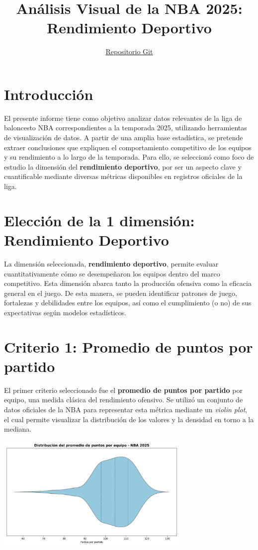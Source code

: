 \documentclass[12pt]{article}
\title{An\'alisis Visual de la NBA 2025: Rendimiento Deportivo}
\author{\href{https://github.com/betonate/VDD/blob/main/README.md}{Repositorio Git}}
\date{}
\begin{document}
\maketitle

\section*{Introducci\'on}

El presente informe tiene como objetivo analizar datos relevantes de la liga de baloncesto NBA correspondientes a la temporada 2025, utilizando herramientas de visualizaci\'on de datos. A partir de una amplia base estad\'istica, se pretende extraer conclusiones que expliquen el comportamiento competitivo de los equipos y su rendimiento a lo largo de la temporada. Para ello, se seleccion\'o como foco de estudio la dimensi\'on del \textbf{rendimiento deportivo}, por ser un aspecto clave y cuantificable mediante diversas m\'etricas disponibles en registros oficiales de la liga.

\section*{Elecci\'on de la 1 dimensi\'on: Rendimiento Deportivo}

La dimensi\'on seleccionada, \textbf{rendimiento deportivo}, permite evaluar cuantitativamente c\'omo se desempe\~naron los equipos dentro del marco competitivo. Esta dimensi\'on abarca tanto la producci\'on ofensiva como la eficacia general en el juego. De esta manera, se pueden identificar patrones de juego, fortalezas y debilidades entre los equipos, as\'i como el cumplimiento (o no) de sus expectativas seg\'un modelos estad\'isticos.

\section*{Criterio 1: Promedio de puntos por partido}

El primer criterio seleccionado fue el \textbf{promedio de puntos por partido} por equipo, una medida cl\'asica del rendimiento ofensivo. Se utiliz\'o un conjunto de datos oficiales de la NBA para representar esta m\'etrica mediante un \textit{violin plot}, el cual permite visualizar la distribuci\'on de los valores y la densidad en torno a la mediana. 

\begin{center}
    \includegraphics[width=0.7\textwidth]{violinplot_pts_per_game_nba2025.png}
\end{center}
\end{document}
